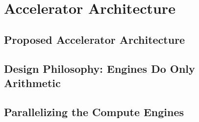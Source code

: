 %
\chapter{Accelerator Architecture}
\label{ch:architecture}

\section{Proposed Accelerator Architecture}
\label{sec:arch-overview}

\section{Design Philosophy: Engines Do Only Arithmetic}
\label{sec:engines-philosophy}

\section{Parallelizing the Compute Engines}
\label{sec:parallelism}


